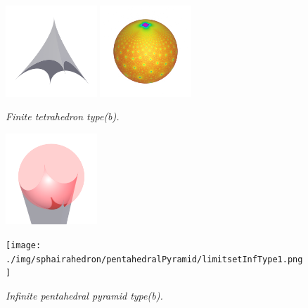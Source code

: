 \documentclass[suppldata, dvipdfmx]{interact}
\theoremstyle{plain}%
\theoremstyle{definition}
\theoremstyle{remark}
\theoremstyle{problemstyle}
\begin{document}
\begin{figure}[H]
 \begin{minipage}{0.5\textwidth}
  \begin{minipage}[t]{0.24\textwidth}
   \centering
   \includegraphics[width=1.35in, height=1.35in, keepaspectratio]{./img/sphairahedron/pentahedralPyramid/sphairahedronFiniteType1.png}
  \end{minipage}
  \hspace*{\fill}
  \begin{minipage}[t]{0.24\textwidth}
   \centering
   \includegraphics[width=1.35in, height=1.35in, keepaspectratio]{./img/sphairahedron/pentahedralPyramid/limitsetFiniteType1.png}
  \end{minipage}
  \hspace*{\fill}
  \caption{\textit{Finite tetrahedron type(b).}}
  \label{fig:pentahedralPyramidFinite2}
 \end{minipage}
 \hspace*{\fill}
 \begin{minipage}{0.5\textwidth}
  \begin{minipage}[t]{0.24\textwidth}
   \centering
   \includegraphics[width=1.35in, height=1.35in, keepaspectratio]{./img/sphairahedron/pentahedralPyramid/sphairahedronInfType1.png}
  \end{minipage}
  \hspace*{\fill}
  \begin{minipage}[t]{0.24\textwidth}
   \centering
   \texttt{[image: ./img/sphairahedron/pentahedralPyramid/limitsetInfType1.png]}
  \end{minipage}
  \hspace*{\fill}
  \caption{\textit{Infinite pentahedral pyramid type(b).}}
  \label{fig:pentahedralPyramidInf2}
 \end{minipage}
\end{figure}
\end{document}
